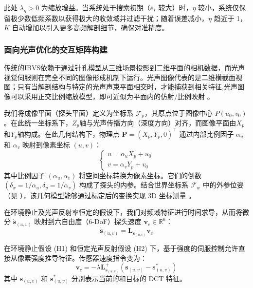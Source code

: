 \documentclass{article}
\begin{document}
此处 $\lambda_{\eta} > 0$ 为缩放增益。当系统处于搜索初期（$\bar{e}_s$ 较大）时，$\eta$ 较小，系统仅保留极少数低频系数以获得极大的收敛域并过滤干扰；随着误差减小，$\eta$ 趋近于 1，$K$ 自动增加以引入更多高频解剖细节，确保对准精度。

\subsubsection{面向光声优化的交互矩阵构建}
\label{sec:PA-Optimized_Interaction_Matrix}

传统的IBVS依赖于通过针孔模型从三维场景投影到二维平面的相机数据，而光声视觉伺服则在完全不同的图像形成机制下运行。光声图像代表的是二维横截面视图；只有当解剖结构与特定的光声声束平面相交时，才能捕获到相关特征,光声图像可以采用正交比例缩放模型，即可近似为平面内的仿射/比例映射 \cite{nadeau2013intensity}。

我们将成像平面（探头平面）定义为坐标系 \(\mathcal{F}_p\)，其原点位于图像中心 \(P(u_0, v_0)\)。在此统一坐标系下，\(Z_p\)轴与光声传播方向（深度方向）对齐，而图像平面由\(X_p\)和\(Y_p\)轴构成。在此几何结构下，物理点 \(\mathbf{P} = (X_p, Y_p, 0)^\top\) 通过内部比例因子 \(\alpha_u\) 和 \(\alpha_v\) 映射到像素坐标 \((u, v)\)：
\begin{equation}
\begin{cases}
u = \alpha_u X_p + u_0 \\[2mm]
v = \alpha_v Y_p + v_0
\end{cases}
\end{equation}
其中比例因子 $(\alpha_u, \alpha_v)$ 将空间坐标转换为像素坐标。它们的倒数 $(\delta_x = 1/\alpha_u, \delta_y = 1/\alpha_v)$ 构成了探头的内参。结合世界坐标系 $\mathcal{F}_w$ 中的外参位姿（见 ），该几何模型能够通过标定后的变换实现 3D 坐标测量 \cite{mercier2005review}。

在环境静止及光声反射率恒定的假设下，我们对频域特征进行时间求导，从而将微分 $\dot{\boldsymbol{s}}_{(u,v)}$ 映射到六自由度（6-DoF）探头速度 $\mathbf{v}_c \in \mathbb{R}^6$：
\begin{equation}
\dot{\boldsymbol{s}}_{(u,v)} = \boldsymbol{L}_{\boldsymbol{s}_{(u,v)}} \mathbf{v}_c
\label{eq:s=LV}
\end{equation}

在环境静止假设 (H1) 和恒定光声反射假设 (H2) \cite{nadeau2013intensity} 下，基于强度的伺服控制允许直接从像素强度推导特征。传感器速度指令变为：
\begin{equation}
\mathbf{v}_c = -\lambda \boldsymbol{L}^{+}_{\boldsymbol{s}_{(u,v)}} (\boldsymbol{s}_{(u,v)} - \boldsymbol{s}^*_{(u,v)})
\end{equation}
其中 $\boldsymbol{s}_{(u,v)}$ 和 $\boldsymbol{s}^*_{(u,v)}$ 分别表示当前的和目标的 DCT 特征。
\end{document}
